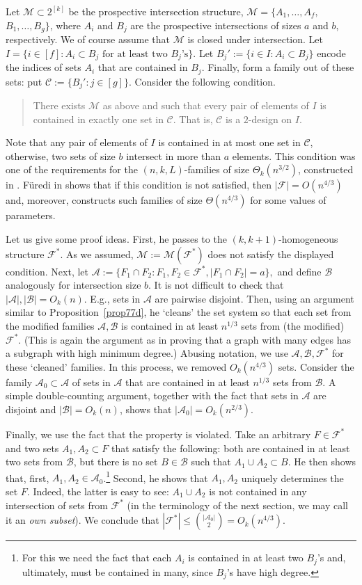 \documentclass[graybox]{svmult}
\renewcommand{\le}{\leqslant}
\newcommand{\ff}{\mathcal{F}}
\newcommand{\aaa}{\mathcal{A}}
\newcommand{\m}{\mathcal}
\begin{document}
 Let $\m M\subset 2^{[k]}$ be the prospective intersection structure,  $\m M=\{A_1,\ldots, A_f,$ $B_1,\ldots,B_g\}$, where $A_i$ and $B_j$ are the prospective intersections of sizes $a$ and $b$, respectively. We of course assume that $\m M$ is closed under intersection. Let $I = \{i\in[f]: A_i\subset B_j\text{ for at least two $B_j$'s}\}$. Let $B_j':=\{i\in I:A_i\subset B_j\}$ encode the indices of sets $A_i$ that are contained in $B_j$. Finally, form a family out of these sets: put $\m C:=\{B_j': j\in[g]\}$.
Consider the following condition.
\begin{quote} There exists $\m M$ as above and such that every pair of elements of $I$ is contained in exactly one set in $\m C$. That is, $\m C$ is a $2$-design on $I$.
\end{quote}
Note that any pair of elements of $I$ is contained in at most one set in $\m C$, otherwise, two sets of size $b$ intersect in more than $a$ elements. This condition was one of the requirements for the  $(n,k,L)$-families of size $\Theta_k(n^{3/2})$, constructed in \cite{Fra83}. F\"uredi in \cite{Fur85} shows that if this condition is not satisfied, then $|\ff| = O(n^{4/3})$ and, moreover, constructs such families of size $\Theta(n^{4/3})$ for some values of parameters.

Let us give some proof ideas. First, he passes to the  $(k,k+1)$-homogeneous structure $\ff^*$. As we assumed,  $\m M:=\m M(\ff^*)$ does not satisfy the displayed condition. Next, let $\m A:=\{F_1\cap F_2:F_1,F_2\in \ff^*, |F_1\cap F_2|=a\},$ and define $\m B$ analogously for intersection size $b$. It is not difficult to check that $|\m A|, |\m B|=O_k(n)$. E.g., sets in $\m A$ are pairwise disjoint. Then, using an argument similar to Proposition~\ref{prop77d}, he `cleans' the set system so that each set from the modified families $\m A, \m B$ is contained in at least $n^{1/3}$ sets from (the modified) $\ff^*$. (This is again the argument as in proving that a graph with many edges has a subgraph with high minimum degree.) Abusing notation, we use $\m A, \m B,\m F^*$ for these `cleaned' families. In this process, we removed $O_k(n^{4/3})$ sets. Consider the family $\m A_0\subset \m A$ of sets in $\m A$ that are contained in at least $n^{1/3}$ sets from $\m B$. A simple double-counting argument, together with the fact that sets in $\m A$ are disjoint and $|\m B|=O_k(n)$, shows that $|\m A_0| = O_k(n^{2/3})$.

Finally, we use the fact that the property is violated. Take an arbitrary $F\in  \ff^*$ and two sets $A_1,A_2\subset F$ that satisfy the following: both are contained in at least two sets from $\m B$, but there is no set $B\in \m B$ such that $A_1\cup A_2\subset B$. He then shows that, first, $A_1,A_2\in \m A_0$.\footnote{For this we need the fact that each $A_i$ is contained in at least two $B_j$'s and, ultimately, must be contained in many, since $B_j$'s have high degree.} Second, he shows that $A_1, A_2$ uniquely determines the set $F$.  Indeed, the latter is easy to see: $A_1\cup A_2$ is not contained in any intersection of sets from $\ff^*$ (in the terminology of the next section, we may call it an {\it own subset}). We conclude that $|\ff^*|\le {|\aaa_0|\choose 2}= O_k(n^{4/3})$.
\end{document}

